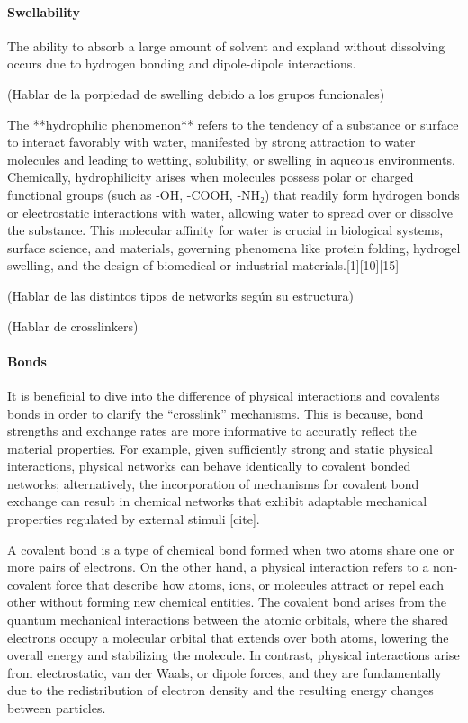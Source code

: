 \paragraph{Swellability} The ability to absorb a large amount of solvent and expland without dissolving occurs due to hydrogen bonding and dipole-dipole interactions.


(Hablar de la porpiedad de swelling debido a los grupos funcionales)

The **hydrophilic phenomenon** refers to the tendency of a substance or surface to interact favorably with water, manifested by strong attraction to water molecules and leading to wetting, solubility, or swelling in aqueous environments. Chemically, hydrophilicity arises when molecules possess polar or charged functional groups (such as -OH, -COOH, -NH₂) that readily form hydrogen bonds or electrostatic interactions with water, allowing water to spread over or dissolve the substance. This molecular affinity for water is crucial in biological systems, surface science, and materials, governing phenomena like protein folding, hydrogel swelling, and the design of biomedical or industrial materials.[1][10][15]


(Hablar de las distintos tipos de networks según su estructura)

(Hablar de crosslinkers)

\paragraph{Bonds} It is beneficial to dive into the difference of physical interactions and covalents bonds in order to clarify the ``crosslink'' mechanisms.
This is because, bond strengths and exchange rates are more informative to accuratly reflect the material properties.
For example, given sufficiently strong and static physical interactions, physical networks can behave identically to covalent bonded networks; 
alternatively, the incorporation of mechanisms for covalent bond exchange can result in chemical networks that exhibit adaptable mechanical properties regulated by external stimuli [cite]. 

A covalent bond is a type of chemical bond formed when two atoms share one or more pairs of electrons. 
On the other hand, a physical interaction refers to a non-covalent force that describe how atoms, ions, or molecules attract or repel each other without forming new chemical entities. 
The covalent bond arises from the quantum mechanical interactions between the atomic orbitals, where the shared electrons occupy a molecular orbital that extends over both atoms, lowering the overall energy and stabilizing the molecule.
In contrast, physical interactions arise from electrostatic, van der Waals, or dipole forces, and they are fundamentally due to the redistribution of electron density and the resulting energy changes between particles.


